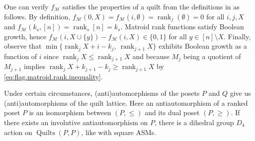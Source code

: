 \documentclass[12pt]{amsart}
\numberwithin{equation}{section}
\theoremstyle{definition}
\newcommand{\quilt}{\operatorname{Quilts}}
\newcommand{\rank}{\operatorname{rank}}
\begin{document}
One can verify $f_{\mathcal{M}}$ satisfies the properties of a quilt
from the definitions in  as follows.
%
By definition,
$f_{\mathcal{M}}(0,X)=f_{\mathcal{M}}(i,\emptyset)=\rank_j(\emptyset)
=0$ for all $i,j,X$ and $f_{\mathcal{M}}(k_{s},[n])=
\rank_{s}[n]=k_{s}$.  Matroid rank functions satisfy Boolean growth,
hence $f_{\mathcal{M}}(i,X\cup \{y \})-f_{\mathcal{M}}(i,X) \in \{0,1
\}$ for all $y \in [n]\setminus X$.  Finally, observe that $\min\{
\rank_j X +i-k_{j},\ \rank_{j+1} X\}$ exhibits Boolean growth as a
function of $i$ since $\rank_j X\leq \rank_{j+1} X$ and because
$M_{j}$ being a quotient of $M_{j+1}$ implies $\rank_j X + k_{j+1} -
k_j \geq \rank_{j+1} X$ by \eqref{eq:flag.matroid.rank.inequality}.

Under certain circumstances, (anti)automorphisms of the posets $P$ and
$Q$ give us (anti)auto\-mor\-phisms of the quilt lattice. Here an
antiautomorphism of a ranked poset $P$ is an isomorphism between $(P,\leq)$
and its dual poset $(P,\geq)$.  If there exists an involutive antiautomorphism on $P$, there is a dihedral group
$D_4$ action on $\quilt(P,P)$, like with square ASMs.
\end{document}
